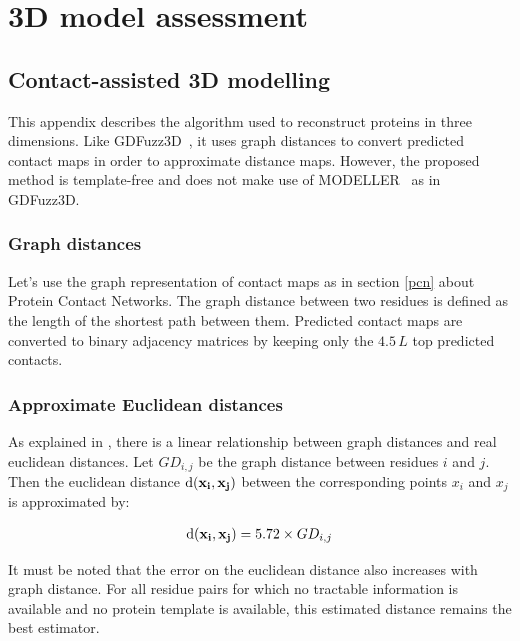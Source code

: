 \chapter{3D model assessment}

  \section{Contact-assisted 3D modelling}

    This appendix describes the algorithm used to reconstruct
    proteins in three dimensions. Like GDFuzz3D~\cite{pietal2015gdfuzz3d},
    it uses graph distances to convert predicted contact maps
    in order to approximate distance maps. However, the proposed method is template-free
    and does not make use of MODELLER~\cite{modeller} as in GDFuzz3D.

  \subsection{Graph distances}

    Let's use the graph representation of contact maps as in section \ref{pcn}
    about Protein Contact Networks.
    The graph distance between two residues is defined as the length of
    the shortest path between them.
    Predicted contact maps are converted to binary adjacency matrices
    by keeping only the $4.5\,L$ top predicted contacts.

  \subsection{Approximate Euclidean distances}

    As explained in \cite{pietal2015gdfuzz3d}, there is a linear relationship
    between graph distances and real euclidean distances.
    Let $GD_{i,j}$ be the graph distance between residues $i$ and $j$. Then
    the euclidean distance $\operatorname{d}(\mathbf{x_i},\mathbf{x_j})$ between the corresponding
    points $x_i$ and $x_j$ is approximated by:

    \begin{align}
        \operatorname{d}(\mathbf{x_i},\mathbf{x_j}) = 5.72 \times GD_{i,j}
    \end{align}

    It must be noted that the error on the euclidean distance also increases
    with graph distance. For all residue pairs for which no tractable information
    is available and no protein template is available,
    this estimated distance remains the best estimator.

